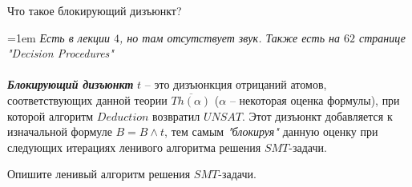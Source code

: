\documentclass[12pt]{extreport}
\theoremstyle{definiton}
\theoremstyle{definition}
\theoremstyle{definition}
\newcommand{\solution}[2][\color{myblue}Ответ]{
\medskip
	\noindent{\bfseries #1 }{{\color{myblue}\bfseries #2:}}
}
\newenvironment{blockquote}{%
  \par%
  \medskip
  \leftskip=1em%
  \noindent}{%
  \par\medskip}
\begin{document}
\Pr[\textcolor{mygreen}{Саит, DONE}] Что такое блокирующий дизъюнкт?
			
\solution{8}
\begin{blockquote}
{\color{myblue}
\textcolor{mypurpur}{\textit{Есть в лекции $4$, но там отсутствует звук. Также есть на $62$ странице "Decision Procedures"}}\\
\\
\noindent \textbf{\textit{Блокирующий дизъюнкт}} $t$ -- это дизъюнкция отрицаний атомов, соответствующих данной теории $\overline{Th(\alpha)}$ ($\alpha$ -- некоторая оценка формулы), при которой алгоритм $Deduction$ возвратил $UNSAT$. Этот дизъюнкт добавляется к изначальной формуле $B = B \wedge t$, тем самым \textit{"блокируя"} данную оценку при следующих итерациях ленивого алгоритма решения $SMT$-задачи.
}
\end{blockquote}

\Pr[\textcolor{mygreen}{Алтана, DONE}] Опишите ленивый алгоритм решения $SMT$-задачи.
			
\end{document}
